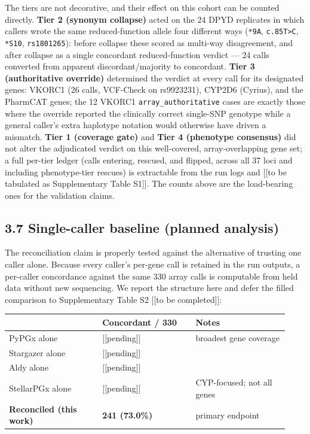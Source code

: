 \documentclass[11pt]{article}
\begin{document}
The tiers are not decorative, and their effect on this cohort can be counted directly. \textbf{Tier 2 (synonym collapse)} acted on the 24 DPYD replicates in which callers wrote the same reduced-function allele four different ways (\texttt{*9A}, \texttt{c.85T\textgreater{}C}, \texttt{*S10}, \texttt{rs1801265}): before collapse these scored as multi-way disagreement, and after collapse as a single concordant reduced-function verdict --- 24 calls converted from apparent discordant/majority to concordant. \textbf{Tier 3 (authoritative override)} determined the verdict at every call for its designated genes: VKORC1 (26 calls, VCF-Check on rs9923231), CYP2D6 (Cyrius), and the PharmCAT genes; the 12 VKORC1 \texttt{array\_authoritative} cases are exactly those where the override reported the clinically correct single-SNP genotype while a general caller's extra haplotype notation would otherwise have driven a mismatch. \textbf{Tier 1 (coverage gate)} and \textbf{Tier 4 (phenotype consensus)} did not alter the adjudicated verdict on this well-covered, array-overlapping gene set; a full per-tier ledger (calls entering, rescued, and flipped, across all 37 loci and including phenotype-tier rescues) is extractable from the run logs and [[to be tabulated as Supplementary Table S1]]. The counts above are the load-bearing ones for the validation claims.


\subsection*{3.7 Single-caller baseline (planned analysis)}

The reconciliation claim is properly tested against the alternative of trusting one caller alone. Because every caller's per-gene call is retained in the run outputs, a per-caller concordance against the same 330 array calls is computable from held data without new sequencing. We report the structure here and defer the filled comparison to Supplementary Table S2 [[to be completed]]:

\begin{longtable}{p{0.31\linewidth}p{0.31\linewidth}p{0.31\linewidth}}
\hline
\textbf{} & \textbf{Concordant / 330} & \textbf{Notes} \\ \hline\endhead
PyPGx alone & [[pending]] & broadest gene coverage \\
Stargazer alone & [[pending]] &  \\
Aldy alone & [[pending]] &  \\
StellarPGx alone & [[pending]] & CYP-focused; not all genes \\
\textbf{Reconciled (this work)} & \textbf{241 (73.0\%)} & primary endpoint \\
\hline
\end{longtable}
\end{document}
